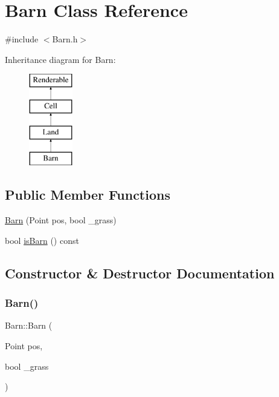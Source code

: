 \hypertarget{classBarn}{}\section{Barn Class Reference}
\label{classBarn}


{\ttfamily \#include $<$Barn.\+h$>$}

Inheritance diagram for Barn\+:\begin{figure}[H]
\begin{center}
\leavevmode
\includegraphics[height=4.000000cm]{classBarn}
\end{center}
\end{figure}
\subsection*{Public Member Functions}
\begin{DoxyCompactItemize}
\item 
\mbox{\hyperlink{classBarn_a04e83b3c8af3ccfde587ab94f7e0dd36}{Barn}} (Point pos, bool \+\_\+grass)
\item 
bool \mbox{\hyperlink{classBarn_a716f3e1ecf4d4d37fe934d29425841a1}{is\+Barn}} () const
\end{DoxyCompactItemize}


\subsection{Constructor \& Destructor Documentation}
\mbox{\label{classBarn_a04e83b3c8af3ccfde587ab94f7e0dd36}} 
\subsubsection{\texorpdfstring{Barn()}{Barn()}}
{\footnotesize\ttfamily Barn\+::\+Barn (\begin{DoxyParamCaption}\item[{Point}]{pos,  }\item[{bool}]{\+\_\+grass }\end{DoxyParamCaption})}



